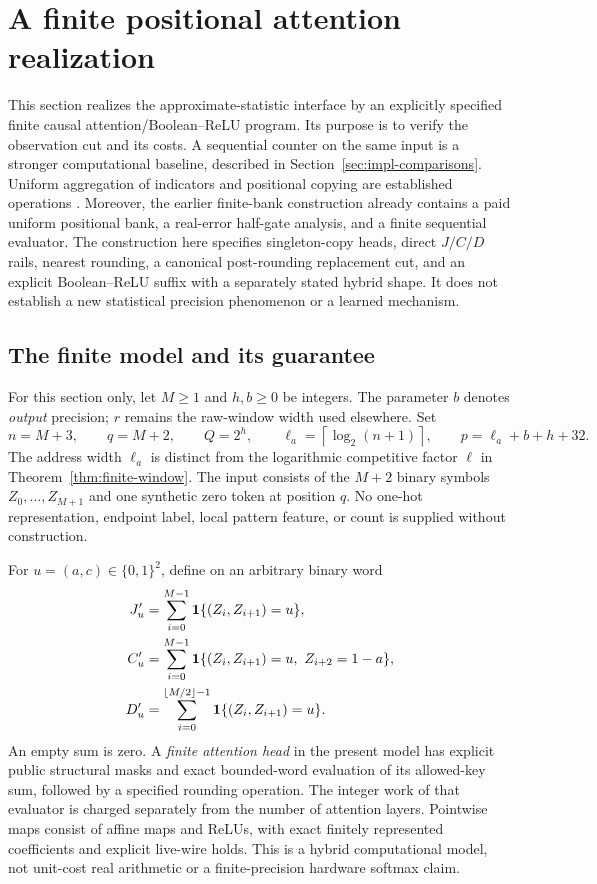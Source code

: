 \section{A finite positional attention realization}\label{sec:implementation-proof}

This section realizes the approximate-statistic interface by an explicitly
specified finite causal attention/Boolean--ReLU program. Its purpose is to
verify the observation cut and its costs. A sequential counter on the same
input is a stronger computational baseline, described in
Section~\ref{sec:impl-comparisons}. Uniform aggregation of indicators and
positional copying are established operations
\citep{WeissGoldbergYahav2021,EdelmanEtAl2024}. Moreover, the earlier
finite-bank construction \citep{BCJ001} already contains a paid uniform
positional bank, a real-error half-gate analysis, and a finite sequential
evaluator. The construction here specifies singleton-copy heads, direct
$J/C/D$ rails, nearest rounding, a canonical post-rounding replacement cut,
and an explicit Boolean--ReLU suffix with a separately stated hybrid shape.
It does not establish a new statistical precision phenomenon or a learned
mechanism.

\subsection{The finite model and its guarantee}\label{sec:impl-statement}

For this section only, let $M\ge1$ and $h,b\ge0$ be integers. The parameter
$b$ denotes \emph{output} precision; $r$ remains the raw-window width used
elsewhere. Set
\begin{equation}\label{eq:impl-scales}
 n=M+3,\qquad q=M+2,\qquad Q=2^h,\qquad
 \ell_a=\left\lceil\log_2(n+1)\right\rceil,\qquad
 p=\ell_a+b+h+32.
\end{equation}
The address width $\ell_a$ is distinct from the logarithmic competitive
factor $\ell$ in Theorem~\ref{thm:finite-window}. The input consists of the
$M+2$ binary symbols $Z_0,\ldots,Z_{M+1}$ and one synthetic zero token at
position $q$. No one-hot representation, endpoint label, local pattern
feature, or count is supplied without construction.

For $u=(a,c)\in\{0,1\}^2$, define on an arbitrary binary word
\begin{align}
 J'_u&=\sum_{i=0}^{M-1}\ind\{(Z_i,Z_{i+1})=u\},\notag\\
 C'_u&=\sum_{i=0}^{M-1}\ind\{(Z_i,Z_{i+1})=u,\ Z_{i+2}=1-a\},\label{eq:impl-counts}\\
 D'_u&=\sum_{i=0}^{\lfloor M/2\rfloor-1}
                \ind\{(Z_i,Z_{i+1})=u\}.\notag
\end{align}
An empty sum is zero. A \emph{finite attention head} in the present model
has explicit public structural masks and exact bounded-word evaluation of
its allowed-key sum, followed by a specified rounding operation. The
integer work of that evaluator is charged separately from the number of
attention layers. Pointwise maps consist of affine maps and ReLUs, with
exact finitely represented coefficients and explicit live-wire holds. This
is a hybrid computational model, not unit-cost real arithmetic or a
finite-precision hardware softmax claim.

